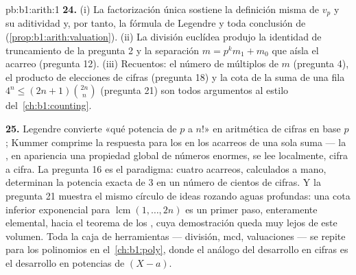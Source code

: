 \begin{solution}{pb:b1:arith:1}
\textbf{24.} (i) La factorización única sostiene la definición misma
de $v_p$ y su aditividad y, por tanto, la fórmula de Legendre y toda
conclusión de  (\cref{prop:b1:arith:valuation}). (ii) La
división euclídea produjo la identidad de truncamiento de la
pregunta 2 y la separación $m = p^km_1 + m_0$ que aísla el acarreo
(pregunta 12). (iii) Recuentos: el número de múltiplos de $m$
(pregunta 4), el producto de elecciones de cifras (pregunta 18) y la
cota de la suma de una fila $4^n \leq (2n+1)\binom{2n}n$
(pregunta 21) son todos argumentos al estilo
del~\cref{ch:b1:counting}.

\textbf{25.} Legendre convierte «qué potencia de $p$  a $n!$» en
aritmética de cifras en base $p$; Kummer comprime la respuesta para
los  en los acarreos de una sola suma --- la
, en apariencia una propiedad global de números
enormes, se lee localmente, cifra a cifra. La pregunta 16 es el
paradigma: cuatro acarreos, calculados a mano, determinan la potencia
exacta de $3$ en un número de cientos de cifras. Y la pregunta 21
muestra el mismo círculo de ideas rozando aguas profundas: una cota
inferior exponencial para $\operatorname{lcm}(1, \dots, 2n)$ es un
primer paso, enteramente elemental, hacia el teorema de los
, cuya demostración queda muy lejos de este volumen.
Toda la caja de herramientas --- división, mcd, valuaciones --- se
repite para los polinomios en el~\cref{ch:b1:poly}, donde el análogo
del desarrollo en cifras es el desarrollo en potencias de $(X - a)$.
\end{solution}
